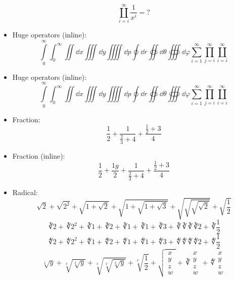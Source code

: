 \documentclass[english,log-declarations=false]{article}
\begin{document}
\begin{itemize}
\[          \coprod_{i=i}^\infty \frac{1}{x^i} = ?
        \]
  \item Huge operators (inline):
        \[ \int\limits_0^\infty \int_0^\infty \iint \dd{x} \iiint \dd{y} \iiiint \dd{p}
          \oint \dd{r} \oiint \dd{\theta} \oiiint \dd{\varphi}
          \sum_{i=1}^\infty \prod_{j=i}^\infty \coprod_{i=i}^\infty \]
  \item Huge operators (inline):
        \begingroup
          \[ \int\limits_0^\infty \int_0^\infty \iint \dd{x} \iiint \dd{y} \iiiint \dd{p}
            \oint \dd{r} \oiint \dd{\theta} \oiiint \dd{\varphi}
            \sum_{i=1}^\infty \prod_{j=i}^\infty \coprod_{i=i}^\infty \]
        \endgroup
  \item Fraction:
        \[ \frac{1}{2} + \frac{1}{\frac{2}{3}+4} + \frac{\frac{1}{2}+3}{4} \]
  \item Fraction (inline):
        \[ \frac{1}{2} + \frac{1g}{2} + \frac{1}{\frac{2}{3}+4} + \frac{\frac{1}{2}+3}{4} \]
  \item Radical:
        \[
            \sqrt{2} + \sqrt{2^2} + \sqrt{1+\sqrt{2}} + \sqrt{1+\sqrt{1+\sqrt{3}}}
          + \sqrt{\sqrt{\sqrt{\sqrt{2}}}} + \sqrt{\frac{1}{2}}
        \]
        \[
            \cuberoot{2} + \cuberoot{2^2} + \cuberoot{1+\cuberoot{2}}
          + \cuberoot{1+\cuberoot{1+\cuberoot{3}}}
          + \cuberoot{\cuberoot{\cuberoot{\cuberoot{2}}}} + \cuberoot{\frac{1}{2}}
        \]
        \[
            \fourthroot{2} + \fourthroot{2^2} + \fourthroot{1+\fourthroot{2}}
          + \fourthroot{1+\fourthroot{1+\fourthroot{3}}}
          + \fourthroot{\fourthroot{\fourthroot{\fourthroot{2}}}} + \fourthroot{\frac{1}{2}}
        \]
        \[
            \sqrt[x]{y} + \sqrt[x]{\sqrt[x]{y}} + \sqrt[x]{\sqrt[x]{\sqrt[x]{y}}}
          + \sqrt[x]{\frac{1}{2}}
          + \sqrt      { \begin{matrix} x \\ y \\ z \\ w \end{matrix} }
          + \cuberoot  { \begin{matrix} x \\ y \\ z \\ w \end{matrix} }
          + \fourthroot{ \begin{matrix} x \\ y \\ z \\ w \end{matrix} }
\]
\end{itemize}
\end{document}

